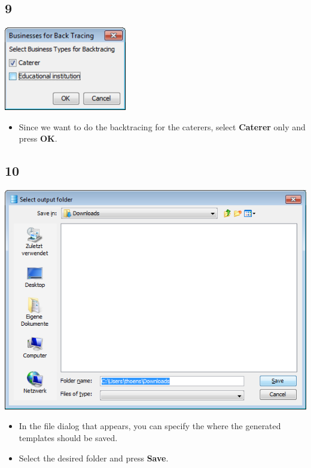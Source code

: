 \documentclass{beamer}
\begin{document}
\subsection{9}
\begin{frame}
	\begin{center}
  		\includegraphics[width=0.4\textwidth]{9.png}
	\end{center}
	\begin{itemize}
		\item Since we want to do the backtracing for the caterers, select \textbf{Caterer} only and press \textbf{OK}.
	\end{itemize}
\end{frame}

\subsection{10}
\begin{frame}
	\begin{center}
  		\includegraphics[height=0.5\textheight]{10.png}
	\end{center}
	\begin{itemize}
		\item In the file dialog that appears, you can specify the where the generated templates should be saved.
		\item Select the desired folder and press \textbf{Save}.
	\end{itemize}
\end{frame}
\end{document}
